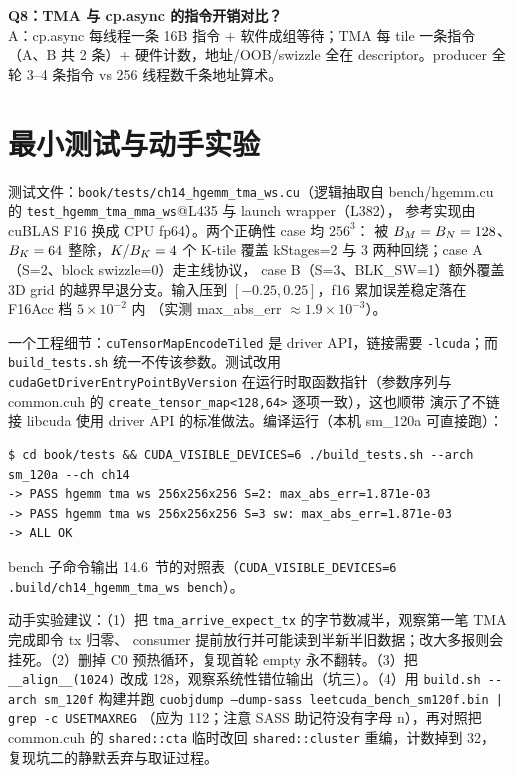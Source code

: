 \textbf{Q8：TMA 与 cp.async 的指令开销对比？}\\
A：cp.async 每线程一条 16B 指令 + 软件成组等待；TMA 每 tile 一条指令（A、B
共 2 条）+ 硬件计数，地址/OOB/swizzle 全在 descriptor。producer 全轮
3--4 条指令 vs 256 线程数千条地址算术。

\section{最小测试与动手实验}

测试文件：\texttt{book/\allowbreak{}tests/\allowbreak{}ch14\_\allowbreak{}hgemm\_\allowbreak{}tma\_\allowbreak{}ws.cu}（逻辑抽取自
bench/hgemm.cu 的 \texttt{test\_\allowbreak{}hgemm\_\allowbreak{}tma\_\allowbreak{}mma\_\allowbreak{}ws}@L435 与 launch wrapper（L382），
参考实现由 cuBLAS F16 换成 CPU fp64）。两个正确性 case 均 $256^3$：
被 $B\sb{M} = B\sb{N} = 128$、$B\sb{K} = 64$ 整除，$K/B\sb{K} = 4$ 个 K-tile
覆盖 kStages=2 与 3 两种回绕；case A（S=2、block swizzle=0）走主线协议，
case B（S=3、BLK\_SW=1）额外覆盖 3D grid 的越界早退分支。输入压到
$[-0.25, 0.25]$，f16 累加误差稳定落在 F16Acc 档 $5\times10^{-2}$ 内
（实测 max\_abs\_err $\approx 1.9\times10^{-3}$）。

一个工程细节：\texttt{cu\allowbreak{}Tensor\allowbreak{}Map\allowbreak{}Encode\allowbreak{}Tiled} 是 driver API，链接需要
\texttt{-lcuda}；而 \texttt{build\_\allowbreak{}tests.\allowbreak{}sh} 统一不传该参数。测试改用
\texttt{cuda\allowbreak{}Get\allowbreak{}Driver\allowbreak{}Entry\allowbreak{}Point\allowbreak{}By\allowbreak{}Version} 在运行时取函数指针（参数序列与
common.cuh 的 \texttt{create\_\allowbreak{}tensor\_\allowbreak{}map\allowbreak{}<128,\allowbreak{}64>} 逐项一致），这也顺带
演示了不链接 libcuda 使用 driver API 的标准做法。编译运行（本机
sm\_120a 可直接跑）：

\begin{lstlisting}[style=console]
$ cd book/tests && CUDA_VISIBLE_DEVICES=6 ./build_tests.sh --arch sm_120a --ch ch14
-> PASS hgemm tma ws 256x256x256 S=2: max_abs_err=1.871e-03
-> PASS hgemm tma ws 256x256x256 S=3 sw: max_abs_err=1.871e-03
-> ALL OK
\end{lstlisting}

bench 子命令输出 14.6~节的对照表（\texttt{CUDA\_\allowbreak{}VISIBLE\_\allowbreak{}DEVICES=\allowbreak{}6
.\allowbreak{}build/\allowbreak{}ch14\_\allowbreak{}hgemm\_\allowbreak{}tma\_\allowbreak{}ws bench}）。

动手实验建议：（1）把
\texttt{tma\_\allowbreak{}arrive\_\allowbreak{}expect\_\allowbreak{}tx} 的字节数减半，观察第一笔 TMA 完成即令 tx 归零、
consumer 提前放行并可能读到半新半旧数据；改大多报则会挂死。（2）删掉 C0 预热循环，复现首轮 empty 永不翻转。（3）把
\texttt{\_\allowbreak{}\_\allowbreak{}align\_\allowbreak{}\_\allowbreak{}(1024)} 改成 128，观察系统性错位输出（坑三）。（4）用
\texttt{build.sh -{}-arch sm\_120f} 构建并跑
\texttt{cuobjdump --dump-sass leetcuda\_bench\_sm120f.bin | grep -c USETMAXREG}
（应为 112；注意 SASS 助记符没有字母 n），再对照把 common.cuh 的
\texttt{shared::cta} 临时改回 \texttt{shared::cluster} 重编，计数掉到 32，
复现坑二的静默丢弃与取证过程。

